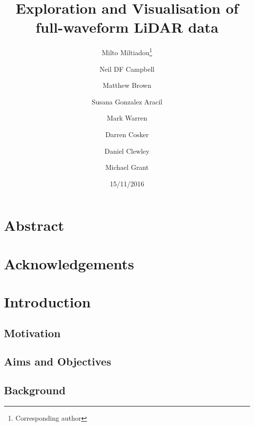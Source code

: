 \documentclass{article}
\begin{document}
\begin{titlepage}
	\title{\textbf{Exploration and Visualisation of full-waveform LiDAR data}}
	\date {15/11/2016}
	\author [1,2,3]{Milto Miltiadou\thanks{Corresponding author}}
	\author [1]{Neil DF Campbell}
	\author [1]{Matthew Brown}
	\author [3]{Susana Gonzalez Aracil}
	\author [2]{Mark Warren}
	\author [1]{Darren Cosker}
	\author [2]{ Daniel Clewley}
	\author [2]{Michael Grant}
	\renewcommand\Authands{and}
	\renewcommand{\floatpagefraction}{1}%


 \maketitle
  

\end{titlepage}

    
\newpage
	\setcounter{secnumdepth}{0}
	\section{Abstract}\label{Abstract}
		
		\newpage
	\section{Acknowledgements}\label{Acknowledgments}
		
		\newpage
    \tableofcontents	 
		\newpage  
	\setcounter{secnumdepth}{4}	
	\section{Introduction} \label{Introduction}
	
			
		\subsection{Motivation} \label{Motivation}
				
			\subsection{Aims and Objectives}\label{Aims}
			
		\subsection{Background}\label{Background}
			
			\newpage
\end{document}
